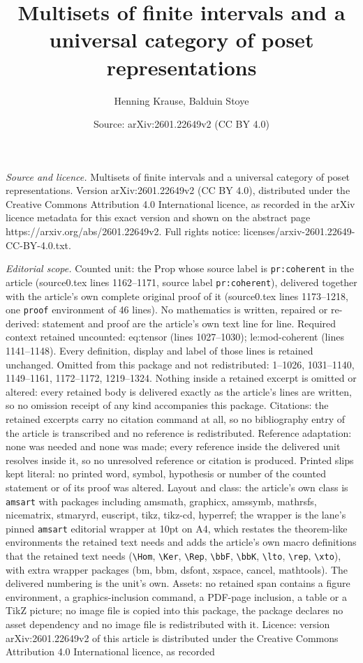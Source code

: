 \documentclass[10pt,a4paper]{amsart}
\title[Multisets of finite intervals and a universal category of po]{Multisets of finite intervals and a universal category of poset representations}
\author{Henning Krause, Balduin Stoye}
\date{Source: arXiv:2601.22649v2 (CC BY 4.0)}
\begin{document}
\maketitle

\noindent\emph{Source and licence.} Multisets of finite intervals and a universal category of poset representations. Version arXiv:2601.22649v2 (CC BY 4.0), distributed under the Creative Commons Attribution 4.0 International licence, as recorded in the arXiv licence metadata for this exact version and shown on the abstract page https://arxiv.org/abs/2601.22649v2. Full rights notice: licenses/arxiv-2601.22649-CC-BY-4.0.txt.\par\smallskip

\noindent\textit{Editorial scope.} Counted unit: the Prop whose source label is \texttt{pr:coherent} in the article (source0.tex lines 1162--1171, source label \texttt{pr:coherent}), delivered together with the article's own complete original proof of it (source0.tex lines 1173--1218, one \texttt{proof} environment of 46 lines). No mathematics is written, repaired or re-derived: statement and proof are the article's own text line for line. Required context retained uncounted: eq:tensor (lines 1027--1030); le:mod-coherent (lines 1141--1148). Every definition, display and label of those lines is retained unchanged. Omitted from this package and not redistributed: 1--1026, 1031--1140, 1149--1161, 1172--1172, 1219--1324. Nothing inside a retained excerpt is omitted or altered: every retained body is delivered exactly as the article's lines are written, so no omission receipt of any kind accompanies this package. Citations: the retained excerpts carry no citation command at all, so no bibliography entry of the article is transcribed and no reference is redistributed. Reference adaptation: none was needed and none was made; every reference inside the delivered unit resolves inside it, so no unresolved reference or citation is produced. Printed slips kept literal: no printed word, symbol, hypothesis or number of the counted statement or of its proof was altered. Layout and class: the article's own class is \texttt{amsart} with packages including amsmath, graphicx, amssymb, mathrsfs, nicematrix, stmaryrd, euscript, tikz, tikz-cd, hyperref; the wrapper is the lane's pinned \texttt{amsart} editorial wrapper at 10pt on A4, which restates the theorem-like environments the retained text needs and adds the article's own macro definitions that the retained text needs (\texttt{\textbackslash Hom}, \texttt{\textbackslash Ker}, \texttt{\textbackslash Rep}, \texttt{\textbackslash bbF}, \texttt{\textbackslash bbK}, \texttt{\textbackslash lto}, \texttt{\textbackslash rep}, \texttt{\textbackslash xto}), with extra wrapper packages (bm, bbm, dsfont, xspace, cancel, mathtools). The delivered numbering is the unit's own. Assets: no retained span contains a figure environment, a graphics-inclusion command, a PDF-page inclusion, a table or a TikZ picture; no image file is copied into this package, the package declares no asset dependency and no image file is redistributed with it. Licence: version arXiv:2601.22649v2 of this article is distributed under the Creative Commons Attribution 4.0 International licence, as recorded 
\end{document}
